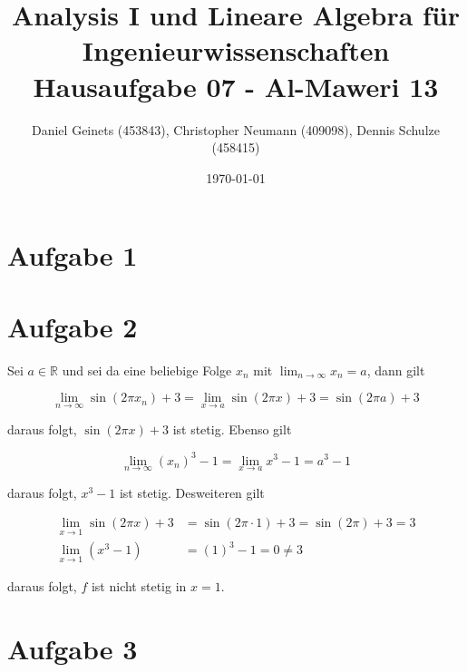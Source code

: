 \documentclass[a4paper, 11pt]{article}
\author{Daniel Geinets (453843), Christopher Neumann (409098), Dennis Schulze (458415)}
\date{\today}
\title{Analysis I und Lineare Algebra für Ingenieurwissenschaften \large  \\ Hausaufgabe 07 - Al-Maweri 13}
\begin{document}
\maketitle
\tableofcontents

\setcounter{secnumdepth}{0}
\newcommand{\tuple}[1]{\left(#1\right)}
\renewcommand{\cfrac}[3]{#1 \tuple{\frac{#2}{#3}}}
\newcommand{\R}{\mathbb{R}}
\newcommand{\Z}{\mathbb{Z}}
\newcommand{\Q}{\mathbb{Q}}
\newcommand{\N}{\mathbb{N}}
\newcommand{\C}{\mathbb{C}}

\makeatletter
\renewcommand*\env@matrix[1][*\c@MaxMatrixCols c]{%
\hskip -\arraycolsep
\let\@ifnextchar\new@ifnextchar
\array{#1}}
\makeatother

\pagebreak

\section{Aufgabe 1}
\label{sec:orgf6a5124}

\section{Aufgabe 2}
\label{sec:org665e8b4}
Sei \(a \in \R\) und sei da eine beliebige Folge \(x_n\) mit
\(\lim_{n \rightarrow \infty} x_n = a\), dann gilt

$$ \lim_{n \rightarrow \infty} \sin(2\pi x_n) + 3 =
    \lim_{x \rightarrow a} \sin(2\pi x) + 3 = \sin(2\pi a) + 3 $$

daraus folgt, \(\sin(2\pi x) + 3\) ist stetig. \newline
Ebenso gilt

$$ \lim_{n \rightarrow \infty} (x_n)^3 - 1 =
    \lim_{x \rightarrow a} x^3 - 1 = a^3 - 1 $$

daraus folgt, \(x^3 - 1\) ist stetig. \newline
Desweiteren gilt

\begin{align*}
    \lim_{x \rightarrow 1} \sin(2\pi x) + 3 &= \sin(2\pi \cdot 1) + 3 =
        \sin(2\pi) + 3 = 3 \\
    \lim_{x \rightarrow 1} (x^3 - 1) &= (1)^3 - 1 = 0 \neq 3
\end{align*}

daraus folgt, \(f\) ist nicht stetig in \(x = 1\).

\section{Aufgabe 3}
\label{sec:org9cd7a94}
\end{document}
